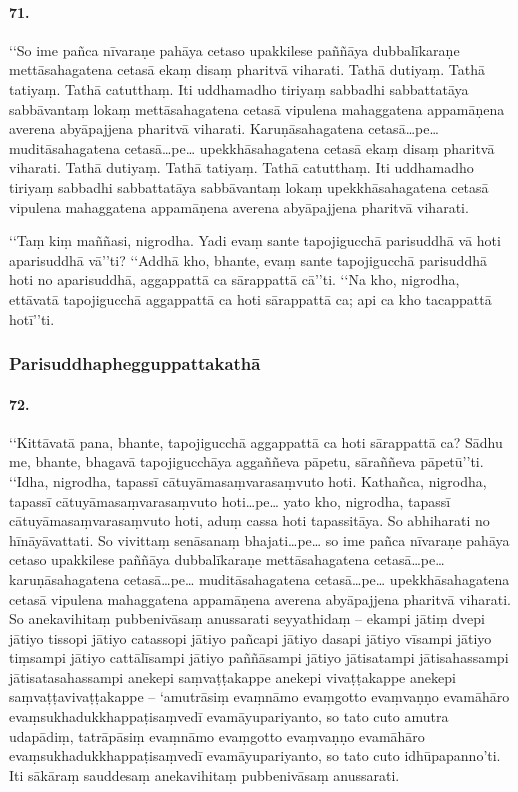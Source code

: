 \paragraph{71.} ‘‘So ime pañca nīvaraṇe pahāya cetaso upakkilese paññāya dubbalīkaraṇe mettāsahagatena cetasā ekaṃ disaṃ pharitvā viharati. Tathā dutiyaṃ. Tathā tatiyaṃ. Tathā catutthaṃ. Iti uddhamadho tiriyaṃ sabbadhi sabbattatāya sabbāvantaṃ lokaṃ mettāsahagatena cetasā vipulena mahaggatena appamāṇena averena abyāpajjena pharitvā viharati. Karuṇāsahagatena cetasā…pe… muditāsahagatena cetasā…pe… upekkhāsahagatena cetasā ekaṃ disaṃ pharitvā viharati. Tathā dutiyaṃ. Tathā tatiyaṃ. Tathā catutthaṃ. Iti uddhamadho tiriyaṃ sabbadhi sabbattatāya sabbāvantaṃ lokaṃ upekkhāsahagatena cetasā vipulena mahaggatena appamāṇena averena abyāpajjena pharitvā viharati.

‘‘Taṃ kiṃ maññasi, nigrodha. Yadi evaṃ sante tapojigucchā parisuddhā vā hoti aparisuddhā vā’’ti? ‘‘Addhā kho, bhante, evaṃ sante tapojigucchā parisuddhā hoti no aparisuddhā, aggappattā ca sārappattā cā’’ti. ‘‘Na kho, nigrodha, ettāvatā tapojigucchā aggappattā ca hoti sārappattā ca; api ca kho tacappattā hotī’’ti.

\subsubsection{Parisuddhaphegguppattakathā}

\paragraph{72.} ‘‘Kittāvatā pana, bhante, tapojigucchā aggappattā ca hoti sārappattā ca? Sādhu me, bhante, bhagavā tapojigucchāya aggaññeva pāpetu, sāraññeva pāpetū’’ti. ‘‘Idha, nigrodha, tapassī cātuyāmasaṃvarasaṃvuto hoti. Kathañca, nigrodha, tapassī cātuyāmasaṃvarasaṃvuto hoti…pe… yato kho, nigrodha, tapassī cātuyāmasaṃvarasaṃvuto hoti, aduṃ cassa hoti tapassitāya. So abhiharati no hīnāyāvattati. So vivittaṃ senāsanaṃ bhajati…pe… so ime pañca nīvaraṇe pahāya cetaso upakkilese paññāya dubbalīkaraṇe mettāsahagatena cetasā…pe… karuṇāsahagatena cetasā…pe… muditāsahagatena cetasā…pe… upekkhāsahagatena cetasā vipulena mahaggatena appamāṇena averena abyāpajjena pharitvā viharati. So anekavihitaṃ pubbenivāsaṃ anussarati seyyathidaṃ – ekampi jātiṃ dvepi jātiyo tissopi jātiyo catassopi jātiyo pañcapi jātiyo dasapi jātiyo vīsampi jātiyo tiṃsampi jātiyo cattālīsampi jātiyo paññāsampi jātiyo jātisatampi jātisahassampi jātisatasahassampi anekepi saṃvaṭṭakappe anekepi vivaṭṭakappe anekepi saṃvaṭṭavivaṭṭakappe – ‘amutrāsiṃ evaṃnāmo evaṃgotto evaṃvaṇṇo evamāhāro evaṃsukhadukkhappaṭisaṃvedī evamāyupariyanto, so tato cuto amutra udapādiṃ, tatrāpāsiṃ evaṃnāmo evaṃgotto evaṃvaṇṇo evamāhāro evaṃsukhadukkhappaṭisaṃvedī evamāyupariyanto, so tato cuto idhūpapanno’ti. Iti sākāraṃ sauddesaṃ anekavihitaṃ pubbenivāsaṃ anussarati.

